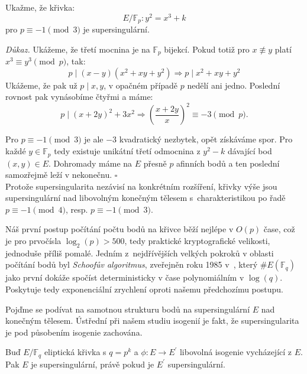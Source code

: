 \documentclass[12pt]{report}
\begin{document}
\begin{priklad}
Ukažme, že křivka:
 $$E/\mathbb{F}_p : y^2 = x^3 + k$$
pro $ p \equiv -1 \pmod{3}$ je supersingulární.
\end{priklad}
\noindent \textit{Důkaz.} Ukážeme, že třetí mocnina je na $\mathbb{F}_p$ bijekcí. Pokud totiž pro $x \not\equiv y$ platí $x^3 \equiv y^3 \pmod{p}$, tak:
\begin{equation*}
p \mid (x-y)(x^2+xy+y^2) \Rightarrow p \mid x^2+xy+y^2 
\end{equation*}
Ukážeme, že pak už $p \mid x,y$, v opačném případě $p$ nedělí ani jedno. Poslední rovnost pak vynásobíme čtyřmi a máme:
\begin{equation*}
p \mid (x+2y)^2 + 3 x^2 \Rightarrow \left(\frac{x+2y}{x} \right)^2 \equiv -3 \pmod{p}.
\end{equation*}

Pro $p \equiv -1 \pmod{3}$ je ale $-3$ kvadratický nezbytek, opět získáváme spor. Pro každé $y \in \mathbb{F}_p$ tedy existuje unikátní třetí odmocnina z $y^2 - k$ dávající bod $(x,y) \in E$. Dohromady máme na $E$ přesně $p$ afinních bodů a ten poslední samozřejmě leží v nekonečnu. \hfill $\square$\\

Protože supersingularita nezávisí na konkrétním rozšíření, křivky výše jsou supersingulární nad libovolným konečným tělesem s~charakteristikou po řadě $p \equiv -1 \pmod{4}$, resp. $p \equiv -1 \pmod{3}$.

Náš první postup počítání počtu bodů na křivce běží nejlépe v $O(p)$ čase, což je pro prvočísla  $\log_2(p) > 500$, tedy praktické kryptografické velikosti, jednoduše příliš pomalé. Jedním z~nejdřívějších velkých pokroků v oblasti počítání bodů byl \textit{Schoofův algoritmus}, zveřejněn roku 1985 v~\cite{Schoof}, který $\# E(\mathbb{F}_q)$ jako první dokáže spočíst deterministicky v čase polynomiálním v $\log(q)$. Poskytuje tedy exponenciální zrychlení oproti našemu předchozímu postupu.

Pojďme se podívat na samotnou strukturu bodů na supersingulární $E$ nad konečným tělesem. Ústřední při našem studiu isogenií je fakt, že supersingularita je pod působením isogenie zachována. 

\begin{veta}
Buď $E/\mathbb{F}_q$ eliptická křivka s $q = p^k$ a $\phi : E \longrightarrow E^\prime$ libovolná isogenie vycházející z $E$. Pak $E$ je supersingulární, právě pokud je $E^\prime$ supersingulární.
\end{veta}
\end{document}
